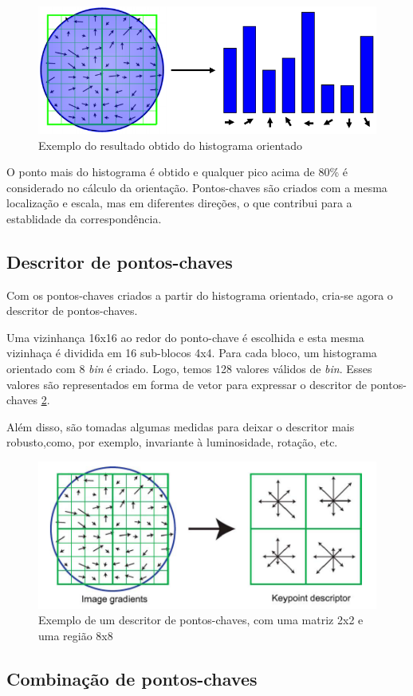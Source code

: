 \begin{figure} [!h]
	\centering
	\includegraphics[width=0.45\linewidth]{figs/histogramaOrientado.png}
	\caption{%
	Exemplo do resultado obtido do histograma orientado
	}\label{fig:histogramaOrientado}
\end{figure}

O ponto mais do histograma é obtido e qualquer pico acima de 80\% é considerado no cálculo da orientação. 
Pontos-chaves são criados com a mesma localização e escala, mas em diferentes direções, o que contribui para a establidade da correspondência.

\subsection*{Descritor de pontos-chaves}

Com os pontos-chaves criados a partir do histograma orientado, cria-se agora o descritor de pontos-chaves.

Uma vizinhança 16x16 ao redor do ponto-chave é escolhida e esta mesma vizinhaça é dividida em 16 sub-blocos 4x4. Para cada bloco, um histograma orientado com 8 \emph{bin} é criado. Logo, temos 128 valores válidos de \emph{bin}. Esses valores são representados em forma de vetor para expressar o descritor de pontos-chaves \ref{fig:descritorKeypoint}. 

Além disso, são tomadas algumas medidas para deixar o descritor mais robusto,como, por exemplo, invariante à luminosidade, rotação, etc.

\begin{figure} [!h]
	\centering
	\includegraphics[width=0.45\linewidth]{figs/descritorKeypoint.png}
	\caption{%
	Exemplo de um descritor de pontos-chaves, com uma matriz 2x2 e uma região 8x8
	}\label{fig:descritorKeypoint}
\end{figure}

\subsection*{Combinação de pontos-chaves}

